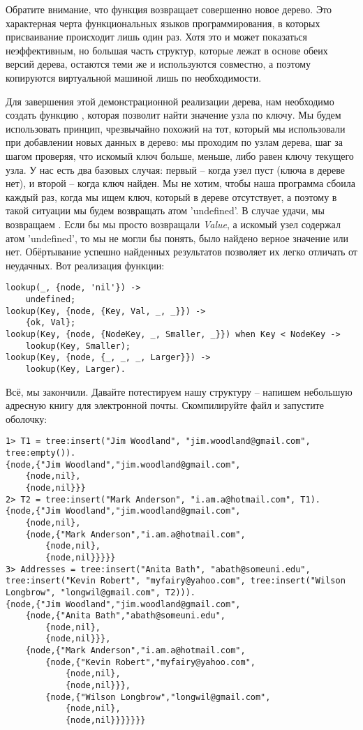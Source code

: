 Обратите внимание, что функция возвращает совершенно новое дерево.
Это характерная черта функциональных языков программирования, в которых присваивание происходит лишь один раз.
Хотя это и может показаться неэффективным, но большая часть структур, которые лежат в основе обеих версий дерева, остаются теми же и используются совместно, а поэтому копируются виртуальной машиной лишь по необходимости.

Для завершения этой демонстрационной реализации дерева, нам необходимо создать функцию , которая позволит найти значение узла по ключу.
Мы будем использовать принцип, чрезвычайно похожий на тот, который мы использовали при добавлении новых данных в дерево: мы проходим по узлам дерева, шаг за шагом проверяя, что искомый ключ больше, меньше, либо равен ключу текущего узла.
У нас есть два базовых случая: первый \--- когда узел пуст (ключа в дереве нет), и второй \--- когда ключ найден.
Мы не хотим, чтобы наша программа сбоила каждый раз, когда мы ищем ключ, который в дереве отсутствует, а поэтому в такой ситуации мы будем возвращать атом 'undefined'.
В случае удачи, мы возвращаем .
Если бы мы просто возвращали \emph{Value}, а искомый узел содержал атом 'undefined', то мы не могли бы понять, было найдено верное значение или нет.
Обёртывание успешно найденных результатов позволяет их легко отличать от неудачных.
Вот реализация функции:
\begin{lstlisting}[style=erlang]
lookup(_, {node, 'nil'}) ->
    undefined;
lookup(Key, {node, {Key, Val, _, _}}) ->
    {ok, Val};
lookup(Key, {node, {NodeKey, _, Smaller, _}}) when Key < NodeKey ->
    lookup(Key, Smaller);
lookup(Key, {node, {_, _, _, Larger}}) ->
    lookup(Key, Larger).
\end{lstlisting}

Всё, мы закончили.
Давайте потестируем нашу структуру \--- напишем небольшую адресную книгу для электронной почты.
Скомпилируйте файл и запустите оболочку:
\begin{lstlisting}[style=erlang]
1> T1 = tree:insert("Jim Woodland", "jim.woodland@gmail.com", tree:empty()).
{node,{"Jim Woodland","jim.woodland@gmail.com",
    {node,nil},
    {node,nil}}}
2> T2 = tree:insert("Mark Anderson", "i.am.a@hotmail.com", T1).
{node,{"Jim Woodland","jim.woodland@gmail.com",
    {node,nil},
    {node,{"Mark Anderson","i.am.a@hotmail.com",
        {node,nil},
        {node,nil}}}}}
3> Addresses = tree:insert("Anita Bath", "abath@someuni.edu", tree:insert("Kevin Robert", "myfairy@yahoo.com", tree:insert("Wilson Longbrow", "longwil@gmail.com", T2))).
{node,{"Jim Woodland","jim.woodland@gmail.com",
    {node,{"Anita Bath","abath@someuni.edu",
        {node,nil},
        {node,nil}}},
    {node,{"Mark Anderson","i.am.a@hotmail.com",
        {node,{"Kevin Robert","myfairy@yahoo.com",
            {node,nil},
            {node,nil}}},
        {node,{"Wilson Longbrow","longwil@gmail.com",
            {node,nil},
            {node,nil}}}}}}}
\end{lstlisting}

